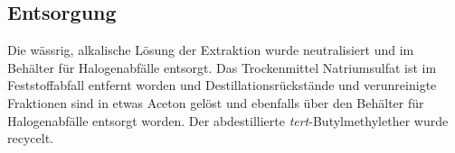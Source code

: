 \subsection*{Entsorgung}
Die wässrig, alkalische Lösung der Extraktion wurde neutralisiert und im Behälter für Halogenabfälle entsorgt. Das Trockenmittel Natriumsulfat ist im Feststoffabfall entfernt worden und Destillationsrückstände und verunreinigte Fraktionen sind in etwas Aceton gelöst und ebenfalls über den Behälter für Halogenabfälle entsorgt worden. Der abdestillierte \textit{tert}-Butylmethylether wurde recycelt.